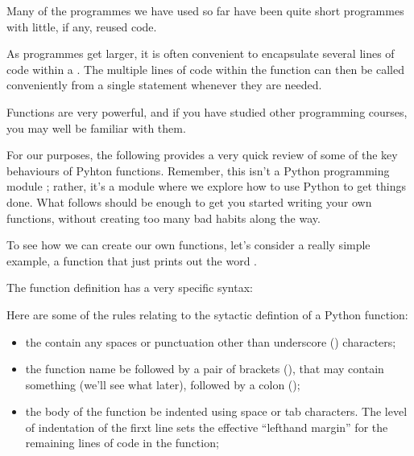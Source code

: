 \documentclass[letterpaper,10pt,english]{sphinxmanual}
\begin{document}
{Many of the programmes we have used so far have been quite short programmes with little, if any, reused code.

As programmes get larger, it is often convenient to encapsulate several lines of code within a . The multiple lines of code within the function can then be called conveniently from a single statement whenever they are needed.

Functions are very powerful, and if you have studied other programming courses, you may well be familiar with them.

For our purposes, the following provides a very quick review of some of the key behaviours of Pyhton functions. Remember, this isn’t a Python programming module ; rather, it’s a module where we explore how to use Python to get things done. What follows should be enough to get you started writing your own functions, without creating too many bad habits along the way.

To see how we can create our own functions, let’s consider a really simple example, a function that just prints out the word .

The function definition has a very specific syntax:

\begin{sphinxVerbatim}[commandchars=\\\{\}]
 
\end{sphinxVerbatim}

Here are some of the rules relating to the sytactic defintion of a Python function:
\begin{itemize}
\item {} 
the   contain any spaces or punctuation other than underscore (\sphinxcode{\sphinxupquote{\_}}) characters;

\item {} 
the function name  be followed by a pair of brackets (\sphinxcode{\sphinxupquote{()}}), that may contain something (we’ll see what later), followed by a colon (\sphinxcode{\sphinxupquote{:}});

\item {} 
the body of the function  be indented using space or tab characters. The level of indentation of the firxt line sets the effective “left\sphinxhyphen{}hand margin” for the remaining lines of code in the function;


\end{itemize}}
\end{document}
